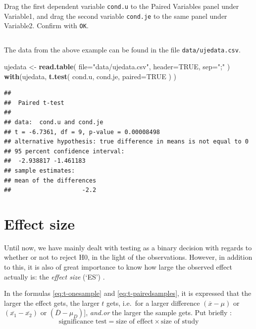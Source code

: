 \documentclass[
]{book}
\newenvironment{Shaded}{\begin{snugshade}}{\end{snugshade}}
\newcommand{\DataTypeTok}[1]{\textcolor[rgb]{0.13,0.29,0.53}{#1}}
\newcommand{\KeywordTok}[1]{\textcolor[rgb]{0.13,0.29,0.53}{\textbf{#1}}}
\newcommand{\NormalTok}[1]{#1}
\newcommand{\OtherTok}[1]{\textcolor[rgb]{0.56,0.35,0.01}{#1}}
\newcommand{\StringTok}[1]{\textcolor[rgb]{0.31,0.60,0.02}{#1}}
\begin{document}
Drag the first dependent variable \texttt{cond.u} to the Paired
Variables panel under Variable1, and drag the second variable \texttt{cond.je} to
the same panel under Variable2. Confirm with \texttt{OK}.

\hypertarget{sec:R-ttest-paired}{%
\subsection{}\label{sec:R-ttest-paired}}

The data from the above example can be found in the file \texttt{data/ujedata.csv}.

\begin{Shaded}
\begin{Highlighting}[]
\NormalTok{ujedata \textless{}{-}}\StringTok{ }\KeywordTok{read.table}\NormalTok{( }\DataTypeTok{file=}\StringTok{"data/ujedata.csv"}\NormalTok{, }\DataTypeTok{header=}\OtherTok{TRUE}\NormalTok{, }\DataTypeTok{sep=}\StringTok{";"}\NormalTok{ )}
\KeywordTok{with}\NormalTok{(ujedata, }\KeywordTok{t.test}\NormalTok{( cond.u, cond.je, }\DataTypeTok{paired=}\OtherTok{TRUE}\NormalTok{ ) )}
\end{Highlighting}
\end{Shaded}

\begin{verbatim}
## 
##  Paired t-test
## 
## data:  cond.u and cond.je
## t = -6.7361, df = 9, p-value = 0.00008498
## alternative hypothesis: true difference in means is not equal to 0
## 95 percent confidence interval:
##  -2.938817 -1.461183
## sample estimates:
## mean of the differences 
##                    -2.2
\end{verbatim}

\hypertarget{sec:ttest-effectsize}{%
\section{Effect size}\label{sec:ttest-effectsize}}

Until now, we have mainly dealt with testing as a binary
decision with regards to whether or not to reject H0, in the light
of the observations. However, in addition to this, it is also of great importance
to know how large the observed effect actually is: the \emph{effect size} (`ES')
\citep{Cohen88, Thom02, Naka07}.

In the formulas \eqref{eq:t-onesample} and \eqref{eq:t-pairedsamples}, it is expressed that the larger the effect gets, the larger \(t\) gets,
i.e.~for a larger difference
\((\overline{x}-\mu)\) or \((\overline{x_1}-\overline{x_2})\) or
\((\overline{D}-\mu_D)\){]}, \emph{and.or} the larger the sample gets.
Put briefly \citep[ p.338, formula 11.10]{Rose08}:
\begin{equation}
  \label{eq:Rose08}
    \textrm{significance test} = 
    \textrm{size of effect} \times \textrm{size of study}
\end{equation}
\end{document}
